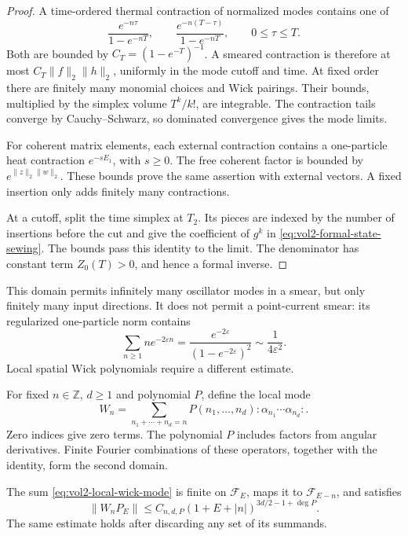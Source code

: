 \begin{proof}
A time-ordered thermal contraction of normalized modes contains
one of
\[
 \frac{e^{-n\tau}}{1-e^{-nT}},\qquad
 \frac{e^{-n(T-\tau)}}{1-e^{-nT}},\qquad0\leq\tau\leq T.
\]
Both are bounded by \(C_T=(1-e^{-T})^{-1}\). A smeared contraction
is therefore at most \(C_T\|f\|_2\|h\|_2\), uniformly in the
mode cutoff and time. At fixed order there are finitely many monomial
choices and Wick pairings. Their bounds, multiplied by the simplex
volume \(T^k/k!\), are integrable. The contraction tails converge
by Cauchy--Schwarz, so dominated convergence gives the mode limits.

For coherent matrix elements, each external contraction contains
a one-particle heat contraction \(e^{-sE_1}\), with \(s\geq0\).
The free coherent factor is bounded by \(e^{\|z\|_2\|w\|_2}\).
These bounds prove the same assertion with external vectors.
A fixed insertion only adds finitely many contractions.

At a cutoff, split the time simplex at \(T_2\). Its pieces are
indexed by the number of insertions before the cut and give the
coefficient of \(g^k\) in \eqref{eq:vol2-formal-state-sewing}.
The bounds pass this identity to the limit. The denominator has
constant term \(Z_0(T)>0\), and hence a formal inverse.
\end{proof}

This domain permits infinitely many oscillator modes in a smear,
but only finitely many input directions. It does not permit a
point-current smear: its regularized one-particle norm contains
\[
 \sum_{n\geq1}n e^{-2\varepsilon n}
 =\frac{e^{-2\varepsilon}}{(1-e^{-2\varepsilon})^2}
 \sim\frac1{4\varepsilon^2}.
\]
Local spatial Wick polynomials require a different estimate.

For fixed \(n\in\mathbb Z\), \(d\geq1\) and polynomial \(P\),
define the local mode
\begin{equation}\label{eq:vol2-local-wick-mode}
 W_n=\sum_{n_1+\cdots+n_d=n}
 P(n_1,\ldots,n_d){:}\alpha_{n_1}\cdots\alpha_{n_d}{:}.
\end{equation}
Zero indices give zero terms. The polynomial \(P\) includes factors
from angular derivatives. Finite Fourier combinations of these
operators, together with the identity, form the second domain.

\begin{lemma}\label{lem:vol2-local-mode-bound}
The sum \eqref{eq:vol2-local-wick-mode} is finite on \(\mathcal F_E\),
maps it to \(\mathcal F_{E-n}\), and satisfies
\[
 \|W_nP_E\|\leq C_{n,d,P}(1+E+|n|)^{3d/2-1+\deg P}.
\]
The same estimate holds after discarding any set of its summands.
\end{lemma}

